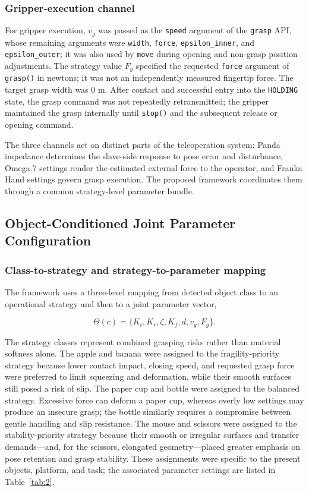 \subsubsection{Gripper-execution channel}
For gripper execution, $v_g$ was passed as the \texttt{speed} argument of the \texttt{grasp} API, whose remaining arguments were \texttt{width}, \texttt{force}, \texttt{epsilon\_inner}, and \texttt{epsilon\_outer}; it was also used by \texttt{move} during opening and non-grasp position adjustments. The strategy value $F_g$ specified the requested \texttt{force} argument of \texttt{grasp()} in newtons; it was not an independently measured fingertip force. The target grasp width was 0 m. After contact and successful entry into the \texttt{HOLDING} state, the grasp command was not repeatedly retransmitted; the gripper maintained the grasp internally until \texttt{stop()} and the subsequent release or opening command.

The three channels act on distinct parts of the teleoperation system: Panda impedance determines the slave-side response to pose error and disturbance, Omega.7 settings render the estimated external force to the operator, and Franka Hand settings govern grasp execution. The proposed framework coordinates them through a common strategy-level parameter bundle.

\subsection{Object-Conditioned Joint Parameter Configuration}
\subsubsection{Class-to-strategy and strategy-to-parameter mapping}
The framework uses a three-level mapping from detected object class to an operational strategy and then to a joint parameter vector,

\begin{equation}
\label{eq:strategy-vector}
\Theta(c)=\{K_t,K_r,\zeta,K_f,d,v_g,F_g\}.
\end{equation}

The strategy classes represent combined grasping risks rather than material softness alone. The apple and banana were assigned to the fragility-priority strategy because lower contact impact, closing speed, and requested grasp force were preferred to limit squeezing and deformation, while their smooth surfaces still posed a risk of slip. The paper cup and bottle were assigned to the balanced strategy. Excessive force can deform a paper cup, whereas overly low settings may produce an insecure grasp; the bottle similarly requires a compromise between gentle handling and slip resistance. The mouse and scissors were assigned to the stability-priority strategy because their smooth or irregular surfaces and transfer demands---and, for the scissors, elongated geometry---placed greater emphasis on pose retention and grasp stability. These assignments were specific to the present objects, platform, and task; the associated parameter settings are listed in Table~\ref{tab:2}.

